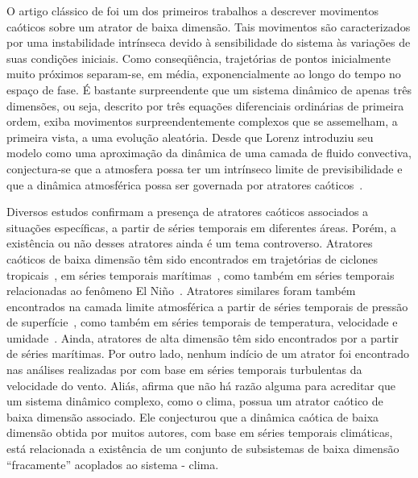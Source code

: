 O artigo clássico de  foi um dos primeiros trabalhos a descrever movimentos caóticos sobre um atrator de baixa dimensão. Tais movimentos são caracterizados por uma instabilidade intrínseca devido à sensibilidade do sistema às variações de suas condições iniciais. Como conseqüência, trajetórias de pontos inicialmente muito próximos separam-se, em média, exponencialmente ao longo do tempo no espaço de fase. É bastante surpreendente que um sistema dinâmico de apenas três dimensões, ou seja, descrito por três equações diferenciais ordinárias de primeira ordem, exiba movimentos surpreendentemente complexos que se assemelham, a primeira vista, a uma evolução aleatória. Desde que Lorenz introduziu seu modelo como uma aproximação da dinâmica de uma camada de fluido convectiva, conjectura-se que a atmosfera possa ter um intrínseco limite de previsibilidade e que a dinâmica atmosférica possa ser governada por atratores caóticos~\cite{weber/95}. 

Diversos estudos confirmam a presença de atratores caóticos associados a situações específicas, a partir de séries temporais em diferentes áreas. Porém, a existência ou não desses atratores ainda é um tema controverso. Atratores caóticos de baixa dimensão têm sido encontrados em trajetórias de ciclones tropicais~\cite{fraedrichandleslie/89}, em séries temporais marítimas~\cite{fraedrich/86,nicolis/84}, como também em séries temporais relacionadas ao fenômeno El Niño~\cite{goberelnino/92}. Atratores similares foram também encontrados na camada limite atmosférica a partir de séries temporais de pressão de superfície~\cite{fraedrich/86}, como também em séries temporais de temperatura, velocidade e umidade~\cite{xin/01,jaramillo/93,gallego/01,tiong/93}. Ainda, atratores de alta dimensão têm sido encontrados por  a partir de séries marítimas. Por outro lado, nenhum indício de um atrator foi encontrado nas análises realizadas por  com base em séries temporais turbulentas da velocidade do vento. Aliás,  afirma que não há razão alguma para acreditar que um sistema dinâmico complexo, como o clima, possua um atrator caótico de baixa dimensão associado. Ele conjecturou que a dinâmica caótica de baixa dimensão obtida por muitos autores, com base em séries temporais climáticas, está relacionada a existência de um conjunto de subsistemas de baixa dimensão ``fracamente'' acoplados ao sistema - clima.

